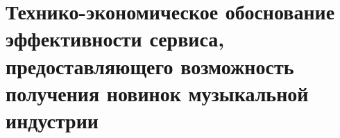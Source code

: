 \newcommand{\byr}{Br}

\section{Технико-экономическое обоснование эффективности сервиса, предоставляющего возможность получения новинок музыкальной индустрии}













\FPeval{\salaryPerHourMjrExact}{\tariffRateFirst * \tariffFactorMjr / \workingHoursInMonth}
\FPeval{\salaryPerHourFstExact}{\tariffRateFirst * \tariffFactorFst / \workingHoursInMonth}
\FPeval{\salaryPerHourScndExact}{\tariffRateFirst * \tariffFactorScnd / \workingHoursInMonth}

